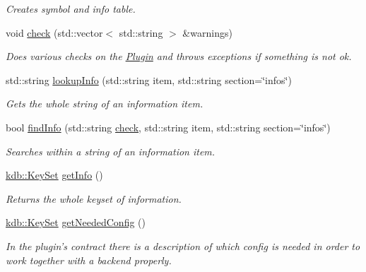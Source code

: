 \begin{DoxyCompactItemize}
\begin{DoxyCompactList}\small\item\em Creates symbol and info table. \end{DoxyCompactList}\item 
void \hyperlink{classkdb_1_1tools_1_1Plugin_a5bb3db65b9d87d18787da8cc65eaca65}{check} (std\+::vector$<$ std\+::string $>$ \&warnings)
\begin{DoxyCompactList}\small\item\em Does various checks on the \hyperlink{classkdb_1_1tools_1_1Plugin}{Plugin} and throws exceptions if something is not ok. \end{DoxyCompactList}\item 
std\+::string \hyperlink{classkdb_1_1tools_1_1Plugin_a5f1dc42adda8340f330eb902812e667d}{lookup\+Info} (std\+::string item, std\+::string section=\char`\"{}infos\char`\"{})
\begin{DoxyCompactList}\small\item\em Gets the whole string of an information item. \end{DoxyCompactList}\item 
bool \hyperlink{classkdb_1_1tools_1_1Plugin_a7911f8c46aea6fe4ec6fcb4788b77beb}{find\+Info} (std\+::string \hyperlink{classkdb_1_1tools_1_1Plugin_a5bb3db65b9d87d18787da8cc65eaca65}{check}, std\+::string item, std\+::string section=\char`\"{}infos\char`\"{})
\begin{DoxyCompactList}\small\item\em Searches within a string of an information item. \end{DoxyCompactList}\item 
\hyperlink{classkdb_1_1KeySet}{kdb\+::\+Key\+Set} \hyperlink{classkdb_1_1tools_1_1Plugin_aa4eac3b2b515104a0d595c717c546ec0}{get\+Info} ()
\begin{DoxyCompactList}\small\item\em Returns the whole keyset of information. \end{DoxyCompactList}\item 
\hyperlink{classkdb_1_1KeySet}{kdb\+::\+Key\+Set} \hyperlink{classkdb_1_1tools_1_1Plugin_ad2a0a4a64d17c479e7cd8b1402275cc7}{get\+Needed\+Config} ()
\begin{DoxyCompactList}\small\item\em In the plugin's contract there is a description of which config is needed in order to work together with a backend properly. \end{DoxyCompactList}\item 

\end{DoxyCompactItemize}
